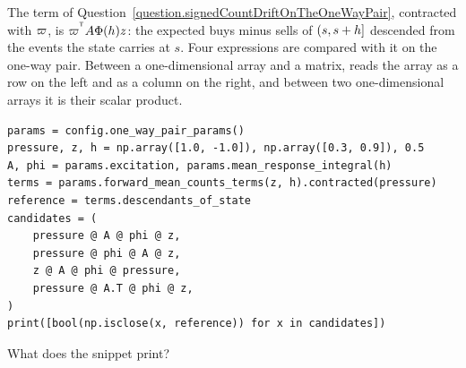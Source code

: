 \begin{question}
\label{question.signedDescendantsOfTheStateContracted}
The term 
of Question~\ref{question.signedCountDriftOnTheOneWayPair},
contracted with $\varpi$,
is $\varpi^{^{\mathsf{T}}}A\Phi(h)z$:
the expected buys minus sells of $(s, s + h]$
descended from the events the state carries at $s$.
Four expressions are compared with it on the one-way pair.
Between a one-dimensional array and a matrix,
 reads the array as a row on the left and as a column on the right,
and between two one-dimensional arrays it is their scalar product.
\begin{lstlisting}[caption={Four contractions}, label=listing.signedDescendantsOfTheStateContracted]
params = config.one_way_pair_params()
pressure, z, h = np.array([1.0, -1.0]), np.array([0.3, 0.9]), 0.5
A, phi = params.excitation, params.mean_response_integral(h)
terms = params.forward_mean_counts_terms(z, h).contracted(pressure)
reference = terms.descendants_of_state
candidates = (
    pressure @ A @ phi @ z,
    pressure @ phi @ A @ z,
    z @ A @ phi @ pressure,
    pressure @ A.T @ phi @ z,
)
print([bool(np.isclose(x, reference)) for x in candidates])
\end{lstlisting}
What does the snippet print?
\begin{choices}
 \choice {}
 \choice {}
 \correctchoice {}
 \choice {}
 \choice {}
\end{choices}
\end{question}

